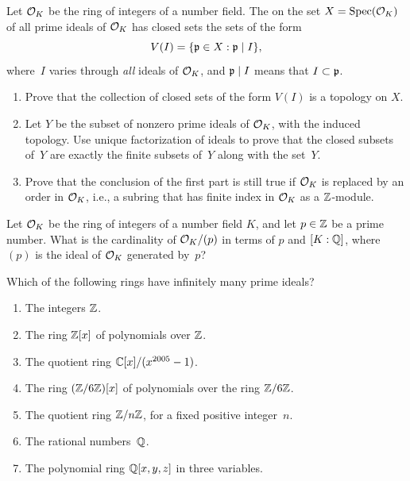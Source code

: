\begin{exercise}
  Let $\mathcal{O}_K$ be the ring of integers of a number field.
  The  on the set $X=\operatorname{Spec}(\mathcal{O}_K)$ of all prime ideals
  of $\mathcal{O}_K$ has closed sets the sets of the form
  $$
    V(I) = \{ \mathfrak{p}\in X : \mathfrak{p} \mid I\},
  $$
  where~$I$ varies through {\em all} ideals of $\mathcal{O}_K$, and $\mathfrak{p}\mid I$ means
  that $I \subset \mathfrak{p}$.
  \begin{enumerate}[label=(\alph*)]
    \item\label{exercise:zariski-part-1} Prove that the collection of closed
    sets of the form $V(I)$ is a topology on $X$.
    \item Let $Y$ be the subset of nonzero prime ideals of $\mathcal{O}_K$, with the
    induced topology. Use unique factorization of ideals to prove that the
    closed subsets of~$Y$ are exactly the finite subsets of~$Y$ along with
    the set~$Y$.
    \item Prove that the conclusion of the first part is still true
    if $\mathcal{O}_K$ is replaced by an order in $\mathcal{O}_K$, i.e., a subring that
    has finite index in $\mathcal{O}_K$ as a $\mathbb{Z}$-module.
  \end{enumerate}
\end{exercise}

\begin{exercise}
  Let $\mathcal{O}_K$ be the ring of integers of a number field $K$, and let $p\in\mathbb{Z}$
  be a prime number. What is the cardinality of $\mathcal{O}_K/(p)$ in terms of $p$
  and $[K:\mathbb{Q}]$, where $(p)$ is the ideal of $\mathcal{O}_K$ generated by~$p$?
\end{exercise}

\begin{exercise}
  Which of the following rings have infinitely many prime ideals?
  \begin{enumerate}[label=(\alph*)]
    \item
    The integers $\mathbb{Z}$.
    \item
    The ring $\mathbb{Z}[x]$ of polynomials over $\mathbb{Z}$.
    \item
    The quotient ring $\mathbb{C}[x]/(x^{2005}-1)$.
    \item
    The ring $(\mathbb{Z}/6\mathbb{Z})[x]$ of polynomials over the ring $\mathbb{Z}/6\mathbb{Z}$.
    \item
    The quotient ring $\mathbb{Z}/n\mathbb{Z}$, for a fixed positive integer~$n$.
    \item
    The rational numbers~$\mathbb{Q}$.
    \item
    The polynomial ring $\mathbb{Q}[x,y,z]$ in three variables.
  \end{enumerate}
\end{exercise}

